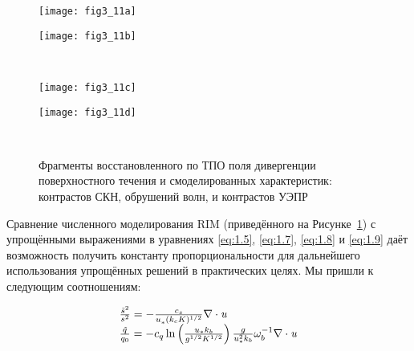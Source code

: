 \begin{figure}[H]
   	\centering
	\begin{minipage}{.47\textwidth}
	    \subcaptionbox{\label{fig:3.11a}}
		{\texttt{[image: fig3\_11a]}}
	\end{minipage}
	\hfill
	\begin{minipage}{.47\textwidth}
	    \subcaptionbox{\label{fig:3.11b}}
		{\texttt{[image: fig3\_11b]}}
	\end{minipage}
	\\
	\begin{minipage}{.47\textwidth}
	    \subcaptionbox{\label{fig:3.11c}}
		{\texttt{[image: fig3\_11c]}}
	\end{minipage}
	\hfill
	\begin{minipage}{.47\textwidth}
	    \subcaptionbox{\label{fig:3.11d}}
		{\texttt{[image: fig3\_11d]}}
	\end{minipage}
    \\
    \caption{Фрагменты восстановленного по ТПО поля дивергенции поверхностного течения и смоделированных характеристик: контрастов СКН, обрушений волн, и контрастов УЭПР}
    \label{fig:3.11}
\end{figure}


Сравнение численного моделирования RIM (приведённого на Рисунке~\ref{fig:3.11}) с упрощёнными выражениями в уравнениях \eqref{eq:1.5}, \eqref{eq:1.7}, \eqref{eq:1.8} и \eqref{eq:1.9} даёт возможность получить константу пропорциональности для дальнейшего использования упрощённых решений в практических целях. Мы пришли к следующим соотношениям:



\begin{equation} \label{eq:3.11)} \begin{array}{l} {\frac{\tilde{s}^{2} }{s^{2} } =-\frac{c_{s} }{u_{*}^{} (k_{c} K)^{1/2} } \nabla \cdot {\it u}} \\ {\frac{\tilde{q}_{} }{q_{0} } =-c_{q} \ln \left(\frac{u_{*} k_{b} }{g^{1/2} K^{1/2} } \right)\frac{g}{u_{*}^{2} k_{b} } \omega _{b}^{-1} \nabla \cdot {\it u}} \end{array} \end{equation} 



